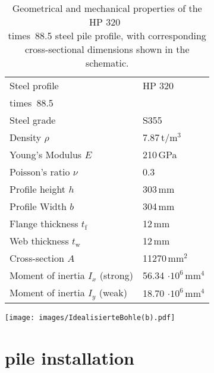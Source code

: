 \begin{table}[htbp]
	\centering
	\caption{Geometrical and mechanical properties of the HP 320~\\times~88.5 steel pile profile, with corresponding cross-sectional dimensions shown in the schematic.}
	\label{tab:pile_properties}
	\begin{minipage}[c]{0.6\textwidth}
		\centering
		\begin{tabular}{ll}
			\toprule
			Steel profile                     & HP 320~\\times~88.5              \\
			Steel grade                       & S355                       \\
			\cmidrule(lr){1-2}
			Density $\rho$                    & 7.87\,t/m$^3$              \\
			Young's Modulus $E$               & 210\,GPa                   \\
			Poisson's ratio $\nu$             & 0.3                        \\
			\cmidrule(lr){1-2}
			Profile height $h$                & 303\,mm                    \\
			Profile Width $b$                 & 304\,mm                    \\
			Flange thickness $t_{\mathrm{f}}$ & 12\,mm                     \\
			Web thickness $t_{\mathrm{w}}$    & 12\,mm                     \\
			Cross-section $A$                 & 11270\,mm$^2$              \\
			Moment of inertia $I_x$ (strong)  & 56.34 $\cdot 10^6$\,mm$^4$ \\
			Moment of inertia $I_y$ (weak)    & 18.70 $\cdot 10^6$\,mm$^4$ \\
			\bottomrule
		\end{tabular}
	\end{minipage}
	\begin{minipage}[c]{0.25\textwidth}
		\centering
		\texttt{[image: images/IdealisierteBohle(b).pdf]}
	\end{minipage}
\end{table}


\section{pile installation}
\label{sec:pile_installation}


